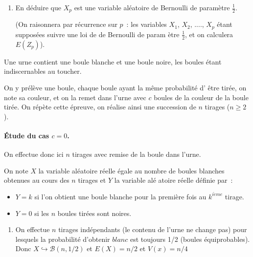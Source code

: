\documentclass[a4paper, 11pt,reqno]{article}
\begin{document}
\begin{exercice}
\begin{enumerate}
\begin{enumerate}
\item En d\'{e}duire que $X_{p}$ est une variable al\'{e}atoire de Bernoulli
de param\`{e}tre $\displaystyle\frac{1}{2}$.

(On raisonnera par r\'{e}currence sur $p$~: les variables $X_{1}$, $X_{2}$,
...., $X_{p}$ \'{e}tant suppos\'{e}es suivre une loi de de Bernoulli de param%
\`{e}tre $\displaystyle\frac{1}{2}$, et on calculera $E(Z_{p})$).
\end{enumerate}
\end{enumerate}

\end{exercice}


\begin{correction}


Une urne contient une boule blanche et une boule noire, les boules \'etant
indiscernables au toucher.

On y pr\'el\`eve une boule, chaque boule ayant la m\^{e}me probabilit\'e d'%
\^{e}tre tir\'ee, on note sa couleur, et on la remet dans l'urne avec $c$
boules de la couleur de la boule tir\'ee. On r\'ep\`ete cette \'epreuve, on
r\'ealise ainsi une succession de $n$ tirages ($n\geqslant 2$).

\paragraph{\'Etude du cas $c=0$.}

On effectue donc ici $n$ tirages avec remise de la boule dans l'urne.

On note $X$ la variable al\'{e}atoire r\'{e}elle \'{e}gale au nombre de
boules blanches obtenues au cours des $n$ tirages et $Y$ la variable al\'{e}%
atoire r\'{e}elle d\'{e}finie par~:

\begin{itemize}
\item $Y=k$ si l'on obtient une boule blanche pour la premi\`{e}re fois au $%
k^{i\grave{e}me}$ tirage.

\item $Y=0$ si les $n$ boules tir\'{e}es sont noires.
\end{itemize}

\begin{enumerate}
\item On effectue $n$ tirages ind\'{e}pendants (le contenu de l'urne ne
change pas) pour lesquels la probabilit\'{e} d'obtenir $blanc$ est toujours
1/2 (boules \'{e}quiprobables). Donc $X\hookrightarrow \mathcal{B}\left(
n,1/2\right) $ et $E\left( X\right) =n/2$ et $V\left( x\right) =n/4$


\end{enumerate}
\end{correction}
\end{document}
